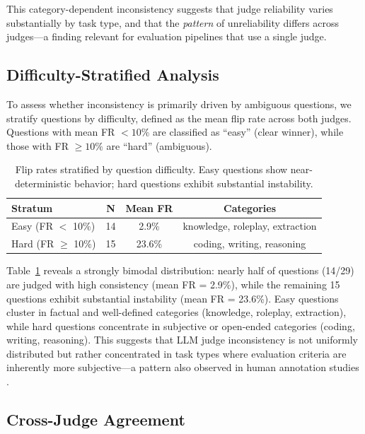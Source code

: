 \documentclass{ijclclp}
\begin{document}
This category-dependent inconsistency suggests that judge reliability varies substantially by task type, and that the \textit{pattern} of unreliability differs across judges---a finding relevant for evaluation pipelines that use a single judge.

\subsection{Difficulty-Stratified Analysis}

To assess whether inconsistency is primarily driven by ambiguous questions, we stratify questions by difficulty, defined as the mean flip rate across both judges. Questions with mean FR $< 10\%$ are classified as ``easy'' (clear winner), while those with FR $\geq 10\%$ are ``hard'' (ambiguous).

\begin{table}[h]
\centering
\caption{Flip rates stratified by question difficulty. Easy questions show near-deterministic behavior; hard questions exhibit substantial instability.}
\label{tab:difficulty}
\begin{tabular}{lccc}
\toprule
\textbf{Stratum} & \textbf{N} & \textbf{Mean FR} & \textbf{Categories} \\
\midrule
Easy (FR $<$ 10\%) & 14 & 2.9\% & knowledge, roleplay, extraction \\
Hard (FR $\geq$ 10\%) & 15 & 23.6\% & coding, writing, reasoning \\
\bottomrule
\end{tabular}
\end{table}

Table~\ref{tab:difficulty} reveals a strongly bimodal distribution: nearly half of questions (14/29) are judged with high consistency (mean FR = 2.9\%), while the remaining 15 questions exhibit substantial instability (mean FR = 23.6\%). Easy questions cluster in factual and well-defined categories (knowledge, roleplay, extraction), while hard questions concentrate in subjective or open-ended categories (coding, writing, reasoning). This suggests that LLM judge inconsistency is not uniformly distributed but rather concentrated in task types where evaluation criteria are inherently more subjective---a pattern also observed in human annotation studies \citep{amidei2019agreement}.

\subsection{Cross-Judge Agreement}
\end{document}
